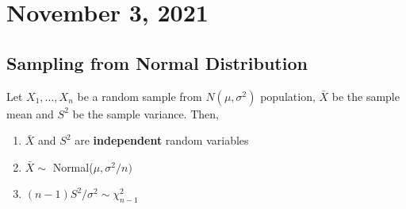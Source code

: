 \section{November 3, 2021}
\subsection{Sampling from Normal Distribution}
\begin{theorem}
    Let $X_1,...,X_n$ be a random sample from $N(\mu,\sigma^2)$ population, $\bar{X}$ be the sample mean and $S^2$ be the sample variance. Then, 
    \begin{enumerate}
        \item $\bar{X}$ and $S^2$ are \textbf{independent} random variables
        \item $\bar{X} \sim$ Normal($\mu,\sigma^2/n)$
        \item $(n-1)S^2/\sigma^2 \sim \chi_{n-1}^2$
    \end{enumerate}
\end{theorem}